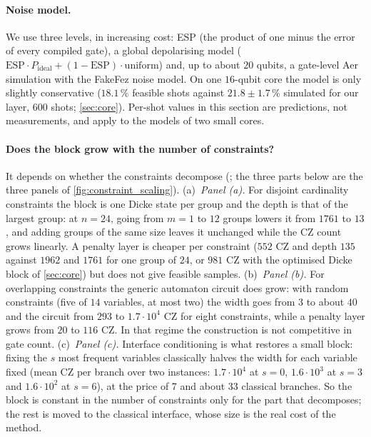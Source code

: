 \paragraph{Noise model.} We use three levels, in increasing cost: ESP (the product of one minus the error of every compiled gate), a global depolarising model ($\mathrm{ESP}\cdot P_\mathrm{ideal}+(1-\mathrm{ESP})\cdot\mathrm{uniform}$) and, up to about $20$ qubits, a gate-level Aer simulation with the FakeFez noise model. On one $16$-qubit core the model is only slightly conservative ($18.1\,\%$ feasible shots against $21.8\pm1.7\,\%$ simulated for our layer, $600$ shots; \cref{sec:core}). Per-shot values in this section are predictions, not measurements, and apply to the models of two small cores.



\paragraph{Does the block grow with the number of constraints?}  It depends on whether the constraints decompose (; the three parts below are the three panels of \cref{fig:constraint_scaling}). (a)~\emph{Panel (a).} For disjoint cardinality constraints the block is one Dicke state per group and the depth is that of the largest group: at $n=24$, going from $m=1$ to $12$ groups lowers it from $1761$ to $13$, and adding groups of the same size leaves it unchanged while the CZ count grows linearly. A penalty layer is cheaper per constraint ($552$ CZ and depth $135$ against $1962$ and $1761$ for one group of $24$, or $981$ CZ with the optimised Dicke block of \cref{sec:core}) but does not give feasible samples. (b)~\emph{Panel (b).} For overlapping constraints the generic automaton circuit does grow: with random constraints (five of $14$ variables, at most two) the width goes from $3$ to about $40$ and the circuit from $293$ to $1.7\cdot10^{4}$ CZ for eight constraints, while a penalty layer grows from $20$ to $116$ CZ. In that regime the construction is not competitive in gate count. (c)~\emph{Panel (c).} Interface conditioning is what restores a small block: fixing the $s$ most frequent variables classically halves the width for each variable fixed (mean CZ per branch over two instances: $1.7\cdot10^4$ at $s=0$, $1.6\cdot10^3$ at $s=3$ and $1.6\cdot10^2$ at $s=6$), at the price of $7$ and about $33$ classical branches. So the block is constant in the number of constraints only for the part that decomposes; the rest is moved to the classical interface, whose size is the real cost of the method.

